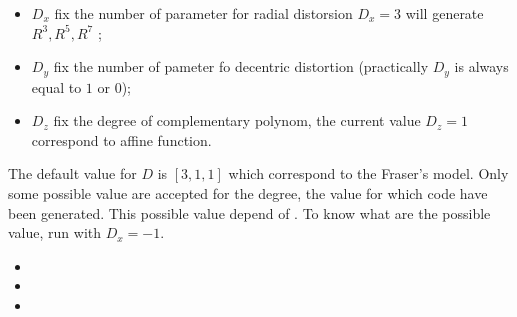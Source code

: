 \documentclass[a4paper]{article}
\begin{document}
\begin{itemize}
   \item  $D_x$ fix the number  of parameter for radial distorsion
          $D_x=3$ will generate $R^3, R^5, R^7$ ;

   \item  $D_y$ fix the number   of pameter fo decentric  distortion
          (practically $D_y$ is always equal to $1$ or $0$);


   \item  $D_z$ fix the degree   of complementary polynom, the
          current value $D_z=1$ correspond to affine function.
\end{itemize}


The default value for $D$ is $[3,1,1]$ which correspond to the Fraser's model.
Only some possible value are accepted for the degree, the value for which
code have been generated.  This possible value depend of . To know
what are the possible value, run  with $D_x=-1$.



\SecRelatedCmd

\begin{itemize}
   \item  {}
   \item  {}
   \item  {}
\end{itemize}

\end{document}
